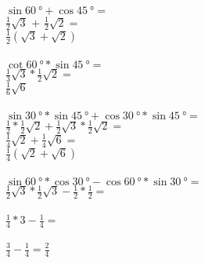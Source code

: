 \documentclass{article}
\begin{document}
 \\
$\sin \SI{60}{\degree} + \cos \SI{45}{\degree} =$ \\
$\frac{1}{2} \sqrt{3}$ + $\frac{1}{2} \sqrt{2} =$ \\
$\frac{1}{2} (\sqrt{3} + \sqrt{2})$ \\
 \\
$\cot \SI{60}{\degree} * \sin \SI{45}{\degree} =$ \\
$\frac{1}{3} \sqrt{3} * \frac{1}{2} \sqrt{2} = $ \\
$\frac{1}{6} \sqrt{6}$ \\
 \\
$\sin \SI{30}{\degree} * \sin \SI{45}{\degree} + \cos \SI{30}{\degree} * \sin \SI{45}{\degree} =$ \\
$\frac{1}{2} * \frac{1}{2} \sqrt{2} + \frac{1}{2} \sqrt{3} * \frac{1}{2} \sqrt{2}=$ \\
$\frac{1}{4} \sqrt{2} + \frac{1}{4} \sqrt{6} =$ \\
$\frac{1}{4} (\sqrt{2} + \sqrt{6})$ \\
 \\
$\sin \SI{60}{\degree} * \cos \SI{30}{\degree} - \cos \SI{60}{\degree} * \sin \SI{30}{\degree } =$ \\
$\frac{1}{2} \sqrt{3} * \frac{1}{2} \sqrt{3} - \frac{1}{2} * \frac{1}{2} =$ \\
\\
$\frac{1}{4} * 3 - \frac{1}{4} =$ \\
\\
$\frac{3}{4} - \frac{1}{4} = \frac{2}{4}$
\end{document}
